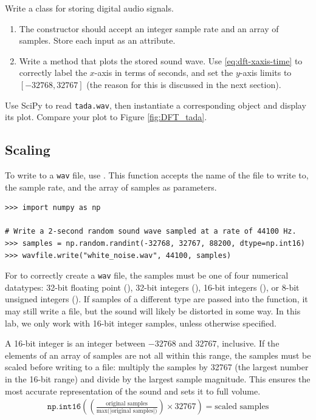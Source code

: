 \begin{problem} %
Write a  class for storing digital audio signals.
\begin{enumerate}
\item The constructor should accept an integer sample rate and an array of samples.
Store each input as an attribute.
\item Write a method that plots the stored sound wave.
Use \eqref{eq:dft-xaxis-time} to correctly label the $x$-axis in terms of seconds, and set the $y$-axis limits to $[-32768,32767]$ (the reason for this is discussed in the next section).
\end{enumerate}
Use SciPy to read \texttt{tada.wav}, then instantiate a corresponding  object and display its plot.
Compare your plot to Figure \ref{fig:DFT_tada}.
\label{prob:fft-SoundWave-init}
\end{problem}

\subsection*{Scaling} %

To write to a \texttt{wav} file, use .
This function accepts the name of the file to write to, the sample rate, and the array of samples as parameters.

\begin{lstlisting}
>>> import numpy as np

# Write a 2-second random sound wave sampled at a rate of 44100 Hz.
>>> samples = np.random.randint(-32768, 32767, 88200, dtype=np.int16)
>>> wavfile.write("white_noise.wav", 44100, samples)
\end{lstlisting}

For  to correctly create a \texttt{wav} file, the samples must be one of four numerical datatypes: 32-bit floating point (), 32-bit integers (), 16-bit integers (), or 8-bit unsigned integers ().
If samples of a different type are passed into the function, it may still write a file, but the sound will likely be distorted in some way.
In this lab, we only work with 16-bit integer samples, unless otherwise specified.

A 16-bit integer is an integer between $-32768$ and $32767$, inclusive.
If the elements of an array of samples are not all within this range, the samples must be scaled before writing to a file: multiply the samples by 32767 (the largest number in the 16-bit range) and divide by the largest sample magnitude.
This ensures the most accurate representation of the sound and sets it to full volume.
\begin{align}
\label{eq:dft-scale-samples}
\texttt{np.int16}\left(\left(\frac{\mbox{original samples}}{\mbox{$\max$(|original samples|)}}\right) \times 32767\right) =\mbox{scaled samples}
\end{align}


